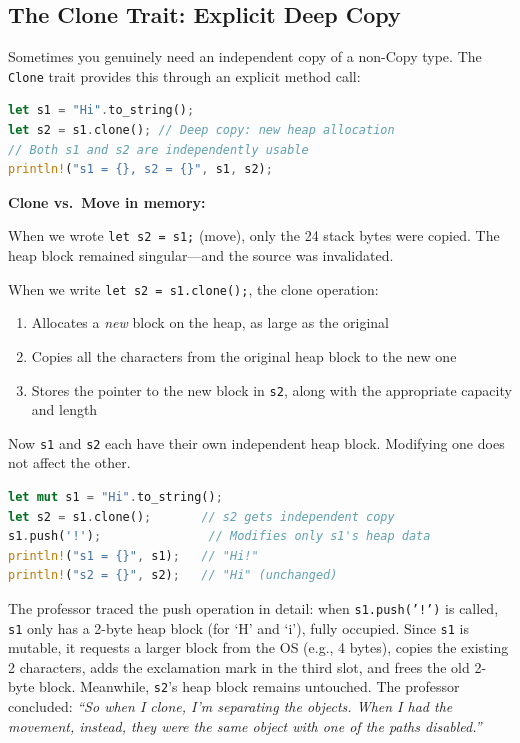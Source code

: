 \subsection{The Clone Trait: Explicit Deep Copy}

Sometimes you genuinely need an independent copy of a non-Copy type. The \texttt{Clone} trait provides this through an explicit method call:

\begin{lstlisting}[language=Rust]
let s1 = "Hi".to_string();
let s2 = s1.clone(); // Deep copy: new heap allocation
// Both s1 and s2 are independently usable
println!("s1 = {}, s2 = {}", s1, s2);
\end{lstlisting}

\begin{memoryblock}
\textbf{Clone vs.\ Move in memory:}

When we wrote \texttt{let s2 = s1;} (move), only the 24 stack bytes were copied. The heap block remained singular---and the source was invalidated.

When we write \texttt{let s2 = s1.clone();}, the clone operation:
\begin{enumerate}
    \item Allocates a \emph{new} block on the heap, as large as the original
    \item Copies all the characters from the original heap block to the new one
    \item Stores the pointer to the new block in \texttt{s2}, along with the appropriate capacity and length
\end{enumerate}
Now \texttt{s1} and \texttt{s2} each have their own independent heap block. Modifying one does not affect the other.
\end{memoryblock}

\begin{lstlisting}[language=Rust]
let mut s1 = "Hi".to_string();
let s2 = s1.clone();       // s2 gets independent copy
s1.push('!');               // Modifies only s1's heap data
println!("s1 = {}", s1);   // "Hi!"
println!("s2 = {}", s2);   // "Hi" (unchanged)
\end{lstlisting}

The professor traced the push operation in detail: when \texttt{s1.push('!')} is called, \texttt{s1} only has a 2-byte heap block (for `H' and `i'), fully occupied. Since \texttt{s1} is mutable, it requests a larger block from the OS (e.g., 4 bytes), copies the existing 2 characters, adds the exclamation mark in the third slot, and frees the old 2-byte block. Meanwhile, \texttt{s2}'s heap block remains untouched. The professor concluded: \emph{``So when I clone, I'm separating the objects. When I had the movement, instead, they were the same object with one of the paths disabled.''}

